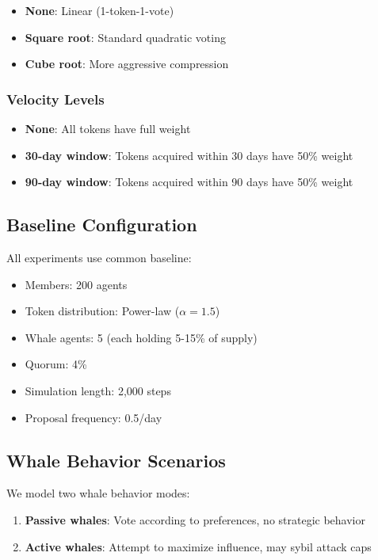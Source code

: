 \begin{itemize}
    \item \textbf{None}: Linear (1-token-1-vote)
    \item \textbf{Square root}: Standard quadratic voting
    \item \textbf{Cube root}: More aggressive compression
\end{itemize}

\subsubsection{Velocity Levels}

\begin{itemize}
    \item \textbf{None}: All tokens have full weight
    \item \textbf{30-day window}: Tokens acquired within 30 days have 50\% weight
    \item \textbf{90-day window}: Tokens acquired within 90 days have 50\% weight
\end{itemize}

\subsection{Baseline Configuration}

All experiments use common baseline:

\begin{itemize}
    \item Members: 200 agents
    \item Token distribution: Power-law ($\alpha = 1.5$)
    \item Whale agents: 5 (each holding 5-15\% of supply)
    \item Quorum: 4\%
    \item Simulation length: 2,000 steps
    \item Proposal frequency: 0.5/day
\end{itemize}

\subsection{Whale Behavior Scenarios}

We model two whale behavior modes:

\begin{enumerate}
    \item \textbf{Passive whales}: Vote according to preferences, no strategic behavior
    \item \textbf{Active whales}: Attempt to maximize influence, may sybil attack caps
\end{enumerate}

